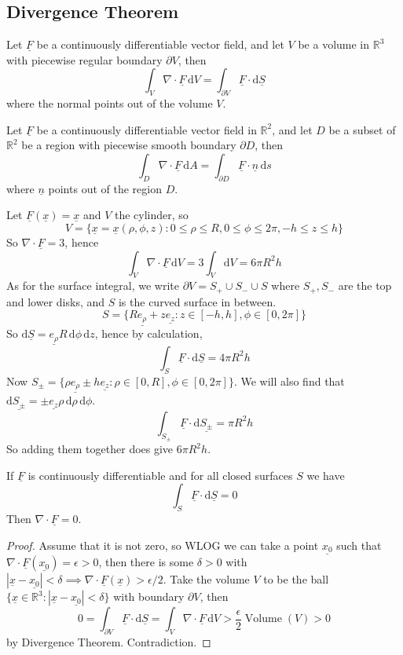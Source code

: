 \subsection{Divergence Theorem}
\begin{proposition}
    Let $\underline{F}$ be a continuously differentiable vector field, and let $V$ be a volume in $\mathbb R^3$ with piecewise regular boundary $\partial V$, then
    $$\int_V\nabla\cdot\underline{F}\,\mathrm dV=\int_{\partial V}\underline{F}\cdot\mathrm d\underline{S}$$
    where the normal points out of the volume $V$.
\end{proposition}
\begin{proposition}
    Let $\underline{F}$ be a continuously differentiable vector field in $\mathbb R^2$, and let $D$ be a subset of $\mathbb R^2$ be a region with piecewise smooth boundary $\partial D$, then
    $$\int_D\nabla\cdot\underline{F}\,\mathrm dA=\int_{\partial D}\underline{F}\cdot\underline{n}\,\mathrm ds$$
    where $\underline{n}$ points out of the region $D$.
\end{proposition}
\begin{example}
    Let $\underline{F}(\underline{x})=\underline{x}$ and $V$ the cylinder, so
    $$V=\{\underline{x}=\underline{x}(\rho,\phi,z):0\le\rho\le R,0\le\phi\le 2\pi,-h\le z\le h\}$$
    So $\nabla\cdot\underline{F}=3$, hence
    $$\int_V\nabla\cdot\underline{F}\,\mathrm dV=3\int_V\mathrm dV=6\pi R^2h$$
    As for the surface integral, we write $\partial V=S_+\cup S_-\cup S$ where $S_+,S_-$ are the top and lower disks, and $S$ is the curved surface in between.
    $$S=\{R\underline{e_\rho}+z\underline{e_z}:z\in[-h,h],\phi\in [0,2\pi]\}$$
    So $\mathrm d\underline{S}=\underline{e_\rho}R\,\mathrm d\phi\,\mathrm dz$, hence by calculation,
    $$\int_S\underline{F}\cdot\mathrm d\underline{S}=4\pi R^2h$$
    Now $S_{\pm}=\{\rho\underline{e_\rho}\pm h\underline{e_z}:\rho\in[0,R],\phi\in[0,2\pi]\}$.
    We will also find that $\mathrm d\underline{S_\pm}=\pm\underline{e_z}\rho\,\mathrm d\rho\,\mathrm d\phi$.
    $$\int_{S_{\pm}}\underline{F}\cdot\mathrm d\underline{S_{\pm}}=\pi R^2h$$
    So adding them together does give $6\pi R^2h$.
\end{example}
\begin{proposition}
    If $\underline{F}$ is continuously differentiable and for all closed surfaces $S$ we have
    $$\int_S\underline{F}\cdot\mathrm d\underline{S}=0$$
    Then $\nabla\cdot\underline{F}=0$.
\end{proposition}
\begin{proof}
    Assume that it is not zero, so WLOG we can take a point $\underline{x_0}$ such that $\nabla\cdot\underline{F}(\underline{x_0})=\epsilon>0$, then there is some $\delta>0$ with $|\underline{x}-\underline{x_0}|<\delta\implies\nabla\cdot\underline{F}(\underline{x})>\epsilon/2$.
    Take the volume $V$ to be the ball $\{\underline{x}\in\mathbb R^3:|\underline{x}-\underline{x_0}|<\delta\}$ with boundary $\partial V$, then
    $$0=\int_{\partial V}\underline{F}\cdot\mathrm d\underline{S}=\int_V\nabla\cdot\underline{F}\,\mathrm dV>\frac{\epsilon}{2}\operatorname{Volume}(V)>0$$
    by Divergence Theorem.
    Contradiction.
\end{proof}
